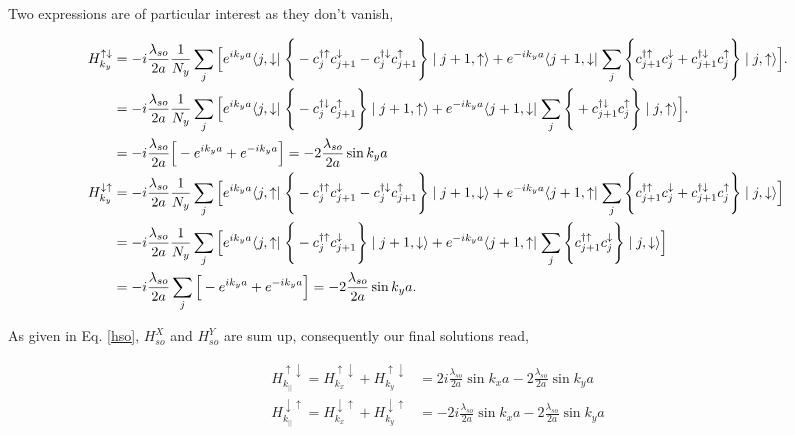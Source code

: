 \documentclass[10pt,prb,showpacs,amssymb,floatfix]{revtex4-1}
\begin{document}
Two expressions are of particular interest as they don't vanish,

\begin{align}
H_{k_y}^{\uparrow \downarrow} &= -i\frac{\lambda_{so}}{2a} \frac{1}{N_y}\sum_{j} \Big{[} e^{i k_y a} \langle j,\downarrow \mid    \Bigg{\{}  - c_{j}^{\dagger \uparrow} c_{j+1}^\downarrow   - c_{j}^{\dagger \downarrow} c_{j+1}^\uparrow \Bigg{\}} \mid j+1,\uparrow\rangle +e^{-i k_y a} \langle j+1,\downarrow \mid \sum_{j} \Bigg{\{} c_{j+1}^{\dagger \uparrow} c_{j}^\downarrow +  c_{j+1}^{\dagger \downarrow} c_{j}^\uparrow  \Bigg{\}} \mid j,\uparrow \rangle \Big{]}. \\
&= -i\frac{\lambda_{so}}{2a} \frac{1}{N_y}\sum_{j} \Big{[} e^{i k_y a} \langle j,\downarrow \mid    \Bigg{\{}   - c_{j}^{\dagger \downarrow} c_{j+1}^\uparrow \Bigg{\}} \mid j+1,\uparrow\rangle +e^{-i k_y a} \langle j+1,\downarrow \mid \sum_{j} \Bigg{\{} +  c_{j+1}^{\dagger \downarrow} c_{j}^\uparrow  \Bigg{\}} \mid j,\uparrow \rangle \Big{]}. \\
&= -i\frac{\lambda_{so}}{2a} \Big{[} -e^{i k_y a} + e^{-i k_y a}  \Big{]} = -2\frac{\lambda_{so}}{2a} \sin k_ya \\
H_{k_y}^{\downarrow \uparrow} &= -i\frac{\lambda_{so}}{2a} \frac{1}{N_y}\sum_{j} \Big{[} e^{i k_y a} \langle j,\uparrow \mid    \Bigg{\{}  - c_{j}^{\dagger \uparrow} c_{j+1}^\downarrow   - c_{j}^{\dagger \downarrow} c_{j+1}^\uparrow \Bigg{\}} \mid j+1,\downarrow\rangle +e^{-i k_y a} \langle j+1,\uparrow \mid \sum_{j} \Bigg{\{} c_{j+1}^{\dagger \uparrow} c_{j}^\downarrow +  c_{j+1}^{\dagger \downarrow} c_{j}^\uparrow  \Bigg{\}} \mid j,\downarrow\rangle \Big{]} \\
&= -i\frac{\lambda_{so}}{2a} \frac{1}{N_y}\sum_{j} \Big{[} e^{i k_y a} \langle j,\uparrow \mid    \Bigg{\{}  - c_{j}^{\dagger \uparrow} c_{j+1}^\downarrow    \Bigg{\}} \mid j+1,\downarrow\rangle +e^{-i k_y a} \langle j+1,\uparrow \mid \sum_{j} \Bigg{\{} c_{j+1}^{\dagger \uparrow} c_{j}^\downarrow   \Bigg{\}} \mid j,\downarrow\rangle \Big{]} \\
&= -i\frac{\lambda_{so}}{2a} \sum_{j} \Big{[} -e^{i k_y a} + e^{-i k_y a}  \Big{]} = -2\frac{\lambda_{so}}{2a} \sin k_ya.
\label{hsoy6}
\end{align}

As given in Eq. \eqref{hso}, $H^X_{so}$ and $H^Y_{so}$ are sum up, consequently our final solutions read,


\begin{align}
H_{k_{||}}^{\uparrow \downarrow} = H_{k_x}^{\uparrow \downarrow} + H_{k_y}^{\uparrow \downarrow} &= 2i \frac{\lambda_{so}}{2a} \sin k_xa -2\frac{\lambda_{so}}{2a} \sin k_ya \\
H_{k_{||}}^{\downarrow \uparrow} = H_{k_x}^{\downarrow \uparrow} + H_{k_y}^{\downarrow \uparrow}&= -2i \frac{\lambda_{so}}{2a} \sin k_xa -2\frac{\lambda_{so}}{2a} \sin k_ya
\label{hsoyf}
\end{align}
\end{document}
